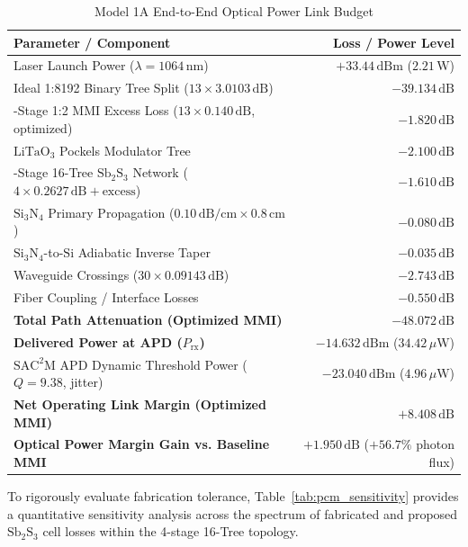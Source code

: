 \documentclass[journal]{IEEEtran}
\begin{document}
\begin{table}[!htbp]
\centering
\footnotesize
\caption{Model 1A End-to-End Optical Power Link Budget}
\label{tab:link_budget}
\begin{tabularx}{\columnwidth}{>{\raggedright\arraybackslash}X r}
\toprule
\textbf{Parameter / Component} & \textbf{Loss / Power Level} \\
\midrule
Laser Launch Power ($\lambda=1064\,\mathrm{nm}$) & $+33.44\,\mathrm{dBm}$ ($2.21\,\mathrm{W}$) \\
Ideal 1:8192 Binary Tree Split ($13 \times 3.0103\,\mathrm{dB}$) & $-39.134\,\mathrm{dB}$ \\
13-Stage 1:2 MMI Excess Loss ($13 \times \mathbf{0.140\,\mathrm{dB}}$, optimized) & $\mathbf{-1.820\,\mathrm{dB}}$ \\
$\mathrm{LiTaO_3}$ Pockels Modulator Tree & $-2.100\,\mathrm{dB}$ \\
4-Stage 16-Tree $\mathrm{Sb_2S_3}$ Network ($4 \times 0.2627\,\mathrm{dB} + \text{excess}$) & $-1.610\,\mathrm{dB}$ \\
$\mathrm{Si_3N_4}$ Primary Propagation ($0.10\,\mathrm{dB/cm} \times 0.8\,\mathrm{cm}$) & $-0.080\,\mathrm{dB}$ \\
$\mathrm{Si_3N_4}$-to-$\mathrm{Si}$ Adiabatic Inverse Taper & $-0.035\,\mathrm{dB}$ \\
Waveguide Crossings ($30 \times 0.09143\,\mathrm{dB}$) & $-2.743\,\mathrm{dB}$ \\
Fiber Coupling / Interface Losses & $-0.550\,\mathrm{dB}$ \\
\midrule
\textbf{Total Path Attenuation (Optimized MMI)} & $\mathbf{-48.072\,\mathrm{dB}}$ \\
\textbf{Delivered Power at APD ($P_{\mathrm{rx}}$)} & $\mathbf{-14.632\,\mathrm{dBm}}$ ($34.42\,\mu\mathrm{W}$) \\
$\mathrm{SAC^2M}$ APD Dynamic Threshold Power ($Q=9.38$, jitter) & $-23.040\,\mathrm{dBm}$ ($4.96\,\mu\mathrm{W}$) \\
\midrule
\textbf{Net Operating Link Margin (Optimized MMI)} & $\mathbf{+8.408\,\mathrm{dB}}$ \\
\textbf{Optical Power Margin Gain vs. Baseline MMI} & $\mathbf{+1.950\,\mathrm{dB}}$ ($+56.7\%$ photon flux) \\
\bottomrule
\end{tabularx}
\end{table}

To rigorously evaluate fabrication tolerance, Table~\ref{tab:pcm_sensitivity} provides a quantitative sensitivity analysis across the spectrum of fabricated and proposed $\mathrm{Sb_2S_3}$ cell losses within the 4-stage 16-Tree topology.
\end{document}
